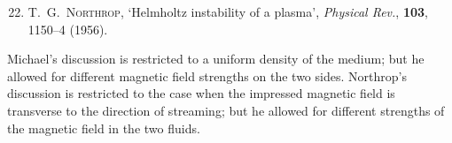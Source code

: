 
\begin{enumerate}\setcounter{enumi}{21}
\item T.~G.~\textsc{Northrop}, `Helmholtz instability of a plasma',
  \emph{Physical Rev.}, \textbf{103}, 1150--4 (1956).
\end{enumerate}

\noindent
Michael's discussion is restricted to a uniform density of the medium;
but he allowed for different magnetic field strengths on the two sides.
Northrop's discussion is restricted to the case when the impressed magnetic
field is transverse to the direction of streaming; but he allowed for
different strengths of the magnetic field in the two fluids.
